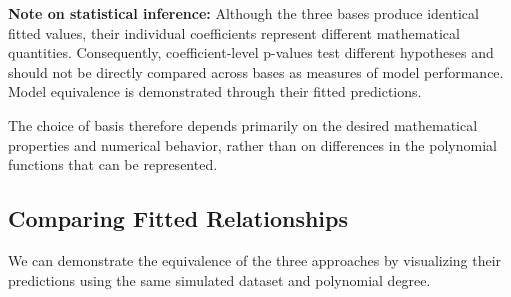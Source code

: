 \documentclass[
  letterpaper,
  DIV=11,
  numbers=noendperiod]{scrreprt}
\begin{document}
\textbf{Note on statistical inference:} Although the three bases produce
identical fitted values, their individual coefficients represent
different mathematical quantities. Consequently, coefficient-level
p-values test different hypotheses and should not be directly compared
across bases as measures of model performance. Model equivalence is
demonstrated through their fitted predictions.

The choice of basis therefore depends primarily on the desired
mathematical properties and numerical behavior, rather than on
differences in the polynomial functions that can be represented.

\subsection{Comparing Fitted
Relationships}\label{comparing-fitted-relationships}

We can demonstrate the equivalence of the three approaches by
visualizing their predictions using the same simulated dataset and
polynomial degree.
\end{document}
